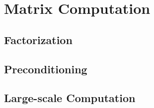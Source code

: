 \chapter{Matrix Computation}
\label{Ch: 8-Mat-Com}
\section{Factorization}

\section{Preconditioning}

\section{Large-scale Computation}